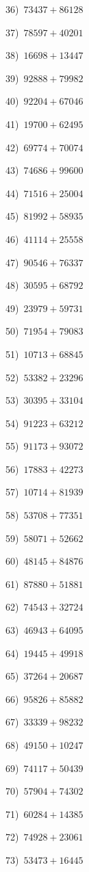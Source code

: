 \documentclass{article}
\begin{document}
\begin{multicols}{2}
36)$\,\,\,73437+86128$ \par 
37)$\,\,\,78597+40201$ \par 
38)$\,\,\,16698+13447$ \par 
39)$\,\,\,92888+79982$ \par 
40)$\,\,\,92204+67046$ \par 
41)$\,\,\,19700+62495$ \par 
42)$\,\,\,69774+70074$ \par 
43)$\,\,\,74686+99600$ \par 
44)$\,\,\,71516+25004$ \par 
45)$\,\,\,81992+58935$ \par 
46)$\,\,\,41114+25558$ \par 
47)$\,\,\,90546+76337$ \par 
48)$\,\,\,30595+68792$ \par 
49)$\,\,\,23979+59731$ \par 
50)$\,\,\,71954+79083$ \par 
51)$\,\,\,10713+68845$ \par 
52)$\,\,\,53382+23296$ \par 
53)$\,\,\,30395+33104$ \par 
54)$\,\,\,91223+63212$ \par 
55)$\,\,\,91173+93072$ \par 
56)$\,\,\,17883+42273$ \par 
57)$\,\,\,10714+81939$ \par 
58)$\,\,\,53708+77351$ \par 
59)$\,\,\,58071+52662$ \par 
60)$\,\,\,48145+84876$ \par 
61)$\,\,\,87880+51881$ \par 
62)$\,\,\,74543+32724$ \par 
63)$\,\,\,46943+64095$ \par 
64)$\,\,\,19445+49918$ \par 
65)$\,\,\,37264+20687$ \par 
66)$\,\,\,95826+85882$ \par 
67)$\,\,\,33339+98232$ \par 
68)$\,\,\,49150+10247$ \par 
69)$\,\,\,74117+50439$ \par 
70)$\,\,\,57904+74302$ \par 
71)$\,\,\,60284+14385$ \par 
72)$\,\,\,74928+23061$ \par 
73)$\,\,\,53473+16445$ \par 

\end{multicols}
\end{document}
